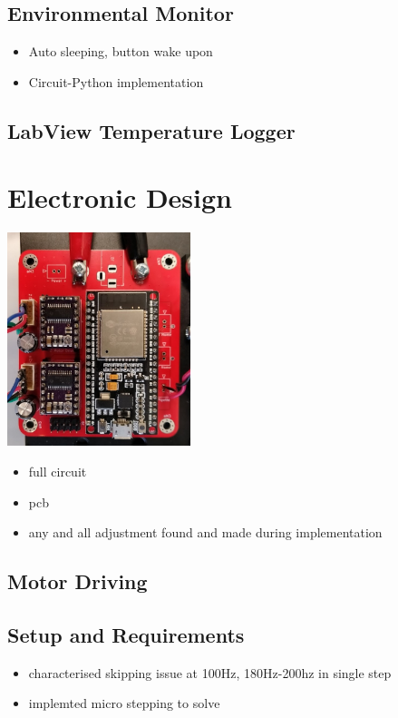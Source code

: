 \subsection{Environmental Monitor}

\begin{itemize}
    \item Auto sleeping, button wake upon
    \item Circuit-Python implementation
\end{itemize}

\subsection{LabView Temperature Logger}

\section{Electronic Design}

\includegraphics[width=0.4\textwidth]{img/control_pcb.jpg}

\begin{itemize}
    \item full circuit
    \item pcb
    \item any and all adjustment found and made during implementation
\end{itemize}

\subsection{Motor Driving}

\subsection{Setup and Requirements}

\begin{itemize}
    \item characterised skipping issue at 100Hz, 180Hz-200hz in single step
    \item implemted micro stepping to solve
\end{itemize}


